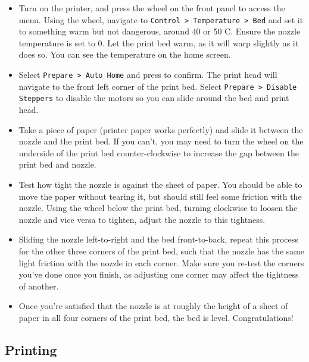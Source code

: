 \documentclass[12pt]{report}
\begin{document}
\begin{itemize}
    \item Turn on the printer, and press the wheel on the front panel to access
        the menu. Using the wheel, navigate to \texttt{Control > Temperature >
        Bed} and set it to something warm but not dangerous, around 40 or 50
        \textdegree C. Ensure the nozzle temperature is set to 0. Let the
        print bed warm, as it will warp slightly as it does so. You can see the
        temperature on the home screen.
    \item Select \texttt{Prepare > Auto Home} and press to confirm. The print
        head will navigate to the front left corner of the print bed. Select
        \texttt{Prepare > Disable Steppers} to disable the motors so you can
        slide around the bed and print head.
    \item Take a piece of paper (printer paper works perfectly) and slide it
        between the nozzle and the print bed. If you can't, you may need to turn
        the wheel on the underside of the print bed counter-clockwise to
        increase the gap between the print bed and nozzle.
    \item Test how tight the nozzle is against the sheet of paper. You should be
        able to move the paper without tearing it, but should still feel some
        friction with the nozzle. Using the wheel below the print bed, turning
        clockwise to loosen the nozzle and vice versa to tighten, adjust the
        nozzle to this tightness.
    \item Sliding the nozzle left-to-right and the bed front-to-back, repeat
        this process for the other three corners of the print bed, such that
        the nozzle has the same light friction with the nozzle in each corner.
        Make sure you re-test the corners you've done once you finish, as
        adjusting one corner may affect the tightness of another.
   \item Once you're satisfied that the nozzle is at roughly the height of a
        sheet of paper in all four corners of the print bed, the bed is level.
        Congratulations!
\end{itemize}

\subsection*{Printing}
\label{sec:printing}
\end{document}
